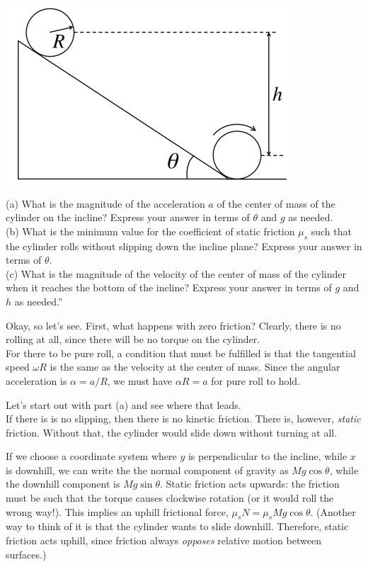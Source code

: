 \documentclass[8.01x]{subfiles}
\begin{document}
\begin{center}
\includegraphics[scale=0.5]{Graphics/h8p6}
\end{center}

(a) What is the magnitude of the acceleration $a$ of the center of mass of the cylinder on the incline? Express your answer in terms of $\theta$ and $g$ as needed.\\
(b) What is the minimum value for the coefficient of static friction $\mu_s$ such that the cylinder rolls without slipping down the incline plane? Express your answer in terms of $\theta$.\\
(c) What is the magnitude of the velocity of the center of mass of the cylinder when it reaches the bottom of the incline? Express your answer in terms of $g$ and $h$ as needed.''

Okay, so let's see. First, what happens with zero friction? Clearly, there is no rolling at all, since there will be no torque on the cylinder.\\
For there to be pure roll, a condition that must be fulfilled is that the tangential speed $\omega R$ is the same as the velocity at the center of mass. Since the angular acceleration is $\alpha = a/R$, we must have $\alpha R = a$ for pure roll to hold.

Let's start out with part (a) and see where that leads.\\
If there is is no slipping, then there is no kinetic friction. There is, however, \emph{static} friction. Without that, the cylinder would slide down without turning at all.

If we choose a coordinate system where $y$ is perpendicular to the incline, while $x$ is downhill, we can write the the normal component of gravity as $M g \cos \theta$, while the downhill component is $M g \sin \theta$. Static friction acts upwards: the friction must be such that the torque causes clockwise rotation (or it would roll the wrong way!). This implies an uphill frictional force, $\mu_s N = \mu_s M g \cos \theta$. (Another way to think of it is that the cylinder wants to slide downhill. Therefore, static friction acts uphill, since friction always \emph{opposes} relative motion between surfaces.) 
\end{document}
